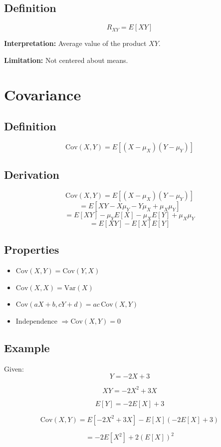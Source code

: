 \documentclass[11pt]{article}
\begin{document}
\subsection{Definition}
\[
R_{XY} = E[XY]
\]

\textbf{Interpretation:} Average value of the product $XY$.

\textbf{Limitation:} Not centered about means.

\section{Covariance}

\subsection{Definition}
\[
\text{Cov}(X,Y) = E[(X-\mu_X)(Y-\mu_Y)]
\]

\subsection{Derivation}
\[
\text{Cov}(X,Y) = E[(X-\mu_X)(Y-\mu_Y)]
\]
\[
= E[XY - X\mu_Y - Y\mu_X + \mu_X\mu_Y]
\]
\[
= E[XY] - \mu_Y E[X] - \mu_X E[Y] + \mu_X\mu_Y
\]
\[
= E[XY] - E[X]E[Y]
\]

\subsection{Properties}
\begin{itemize}[noitemsep]
\item $\text{Cov}(X,Y) = \text{Cov}(Y,X)$
\item $\text{Cov}(X,X) = \text{Var}(X)$
\item $\text{Cov}(aX+b, cY+d) = ac\,\text{Cov}(X,Y)$
\item Independence $\Rightarrow \text{Cov}(X,Y)=0$
\end{itemize}

\subsection{Example}
Given:
\[
Y = -2X + 3
\]

\[
XY = -2X^2 + 3X
\]

\[
E[Y] = -2E[X] + 3
\]

\[
\text{Cov}(X,Y) = E[-2X^2 + 3X] - E[X](-2E[X]+3)
\]

\[
= -2E[X^2] + 2(E[X])^2
\]
\end{document}
